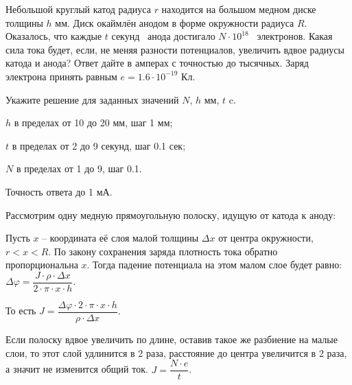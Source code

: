 
Небольшой круглый катод радиуса $r$ находится на большом медном диске толщины $h$ мм. Диск окаймлён анодом в форме окружности радиуса
$R$. Оказалось, что каждые $t$ секунд  анода достигало $N \cdot 10^{18}$  электронов. Какая сила тока будет, если, не
меняя разности потенциалов, увеличить вдвое радиусы катода и анода? Ответ дайте в амперах с точностью до тысячных. Заряд электрона
принять равным \linebreak $e = 1.6 \cdot 10^{-19}$ Кл.

Укажите решение для заданных значений $N$, $h$ мм, $t$ c.

\paramSection

$h$ в пределах от 10 до 20 мм, шаг  1 мм;   

$t$ в пределах от 2 до 9 секунд, шаг 0.1 сек;

$N$ в пределах от 1 до 9, шаг 0.1.

Точность ответа  до  1 мА.

\soultionSection

Рассмотрим одну медную прямоугольную полоску, идущую от катода к аноду:


Пусть $x$ –  координата её слоя малой толщины $\Delta x$ от центра окружности, \linebreak $r<x<R$. По закону 
сохранения заряда плотность тока обратно пропорциональна $x$. Тогда падение потенциала на этом малом 
слое будет равно: $\Delta \varphi=\dfrac{J \cdot \rho  \cdot \Delta x}{2 \cdot \pi \cdot x \cdot h}$.  

То есть $J=\dfrac{\Delta \varphi \cdot 2 \cdot \pi \cdot x \cdot h}{\rho  \cdot \Delta x}$.

Если полоску вдвое увеличить по длине, оставив такое же разбиение на малые слои, то этот слой удлинится 
в 2 раза, расстояние до центра увеличится в 2 раза, а значит не изменится общий ток. $J = \dfrac{N \cdot e}{t}$.

